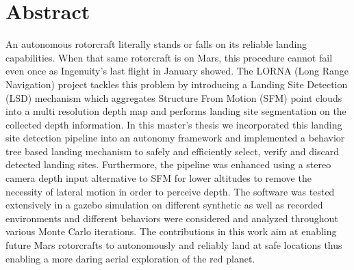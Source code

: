 \chapter*{Abstract}

An autonomous rotorcraft literally stands or falls on its reliable landing capabilities. When that same rotorcraft is on Mars, this procedure cannot fail even once as Ingenuity's last flight in January showed. The LORNA (Long Range Navigation) project tackles this problem by introducing a Landing Site Detection (LSD) mechanism which aggregates Structure From Motion (SFM) point clouds into a multi resolution depth map and performs landing site segmentation on the collected depth information. In this master's thesis we incorporated this landing site detection pipeline into an autonomy framework and implemented a behavior tree based landing mechanism to safely and efficiently select, verify and discard detected landing sites. Furthermore, the pipeline was enhanced using a stereo camera depth input alternative to SFM for lower altitudes to remove the necessity of lateral motion in order to perceive depth. The software was tested extensively in a gazebo simulation on different synthetic as well as recorded environments and different behaviors were considered and analyzed throughout various Monte Carlo iterations. The contributions in this work aim at enabling future Mars rotorcrafts to autonomously and reliably land at safe locations thus enabling a more daring aerial exploration of the red planet.